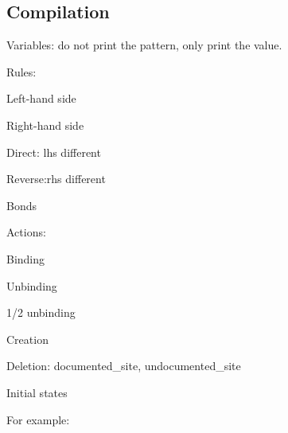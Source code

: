 \documentclass{article}
\begin{document}
\subsection{Compilation}

\begin{i}
\item Variables: do not print the pattern, only print the value.

\item Rules:
 \begin{i}
  \item Left-hand side
  \item Right-hand side
  \item Direct: lhs different
  \item Reverse:rhs different
  \item Bonds
  \item Actions:
   \begin{e}
     \item Binding
     \item Unbinding
     \item 1/2 unbinding
     \item Creation
     \item Deletion: documented\_site, undocumented\_site
   \end{e}

\end{i}

\item Initial states

\end{i}

For example:
\end{document}
